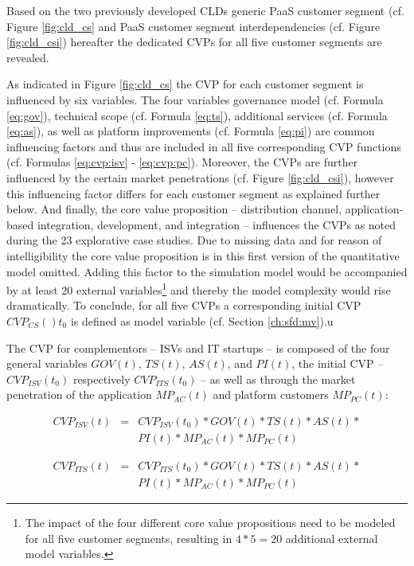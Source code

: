 Based on the two previously developed \acp{CLD} generic \ac{PaaS} customer segment (cf. Figure \ref{fig:cld_cs} and \ac{PaaS} customer segment interdependencies (cf. Figure \ref{fig:cld_csi}) hereafter the dedicated \acp{CVP} for all five customer segments are revealed.

As indicated in Figure \ref{fig:cld_cs} the \ac{CVP} for each customer segment is influenced by six variables. The four variables governance model (cf. Formula \ref{eq:gov}), technical scope (cf. Formula \ref{eq:ts}), additional services (cf. Formula \ref{eq:as}), as well as platform improvements (cf. Formula \ref{eq:pi}) are common influencing factors and thus are included in all five corresponding \ac{CVP} functions (cf. Formulas \ref{eq:cvp:isv} - \ref{eq:cvp:pc}). Moreover, the \acp{CVP} are further influenced by the certain market penetrations (cf. Figure \ref{fig:cld_csi}), however this influencing factor differs for each customer segment as explained further below. And finally, the core value proposition -- distribution channel, application-based integration, development, and integration -- influences the \acp{CVP} as noted during the 23 explorative case studies. Due to missing data and for reason of intelligibility the core value proposition is in this first version of the quantitative model omitted. Adding this factor to the simulation model would be accompanied by at least 20 external variables\footnote{The impact of the four different core value propositions need to be modeled for all five customer segments, resulting in $4*5=20$ additional external model variables.} and thereby the model complexity would rise dramatically. To conclude, for all five \acp{CVP} a corresponding initial \ac{CVP} $CVP_{CS}()t_0$ is defined as model variable (cf. Section \ref{ch:sfd:mv}).u

The \ac{CVP} for complementors -- \acp{ISV} and \ac{IT} startups -- is composed of the four general variables $GOV(t)$, $TS(t)$, $AS(t)$, and $PI(t)$, the initial \ac{CVP} -- $CVP_{ISV}(t_0)$ respectively $ CVP_{ITS}(t_0)$ -- as well as through the market penetration of the application $MP_{AC}(t)$ and platform customers $MP_{PC}(t)$:

\begin{eqnarray}\label{eq:cvp:isv}
		CVP_{ISV}(t) & = & CVP_{ISV}(t_0) * GOV(t) * TS(t) * AS(t) * \nonumber \\ & & PI(t) * MP_{AC}(t) * MP_{PC}(t)
\end{eqnarray}

\begin{eqnarray}\label{eq:cvp:its}
		CVP_{ITS}(t) & = & CVP_{ITS}(t_0) * GOV(t) * TS(t) * AS(t) * \nonumber \\ & & PI(t) * MP_{AC}(t) * MP_{PC}(t)
\end{eqnarray}

